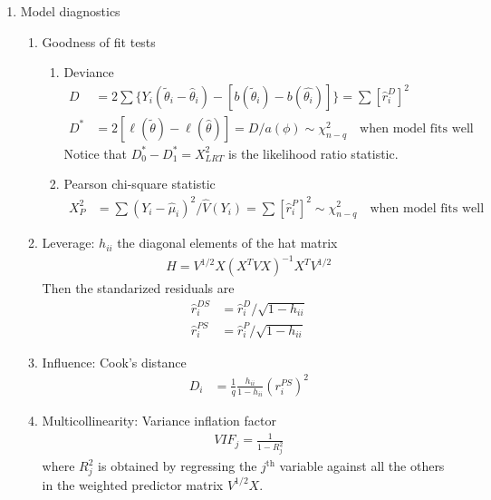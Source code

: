 \documentclass{amsart}
\begin{document}
\begin{enumerate}
\item Model diagnostics
  \begin{enumerate}
  \item Goodness of fit tests
    \begin{enumerate}
    \item Deviance
      \begin{align*}
        D & = 2 \sum \{ Y_i (\tilde{\theta}_i - \hat{\theta}_i) - [b(\tilde{\theta}_i) - b(\hat{\theta_i})] \} 
            = \sum[\hat{r}^D_i]^2 \\
        D^* & =  2 [ \ell(\tilde{\theta}) - \ell(\hat{\theta})]
              = D / a(\phi)
              \sim \chi^2_{n-q} \quad \text{when model fits well}
      \end{align*}
      Notice that $D^*_0 - D^*_1 = X^2_{LRT}$ is the likelihood ratio
      statistic.
    \item Pearson chi-square statistic
      \begin{align*}
        X^2_P & = \sum (Y_i - \hat{\mu}_i)^2 / \hat{V}(Y_i)
                = \sum[\hat{r}^P_i]^2
                \sim \chi^2_{n-q} \quad \text{when model fits well}
      \end{align*}
    \end{enumerate}

  \item Leverage: $h_{ii}$ the diagonal elements of the hat matrix
    \begin{align*}
      H = V^{1/2} X(X^T V X)^{-1} X^T V^{1/2}
    \end{align*}
    Then the standarized residuals are
    \begin{align*}
      \hat{r}^{DS}_i & = \hat{r}^D_i / \sqrt{1-h_{ii}} \\
      \hat{r}^{PS}_i & = \hat{r}^P_i / \sqrt{1-h_{ii}} 
    \end{align*}

  \item Influence: Cook's distance
    \begin{align*}
      D_i & = \frac{1}{q} \frac{h_{ii}}{1-h_{ii}}(r^{PS}_i)^2
    \end{align*}
    
  \item Multicollinearity: Variance inflation factor
    \begin{align*}
      VIF_j = \frac{1}{1-R^2_j}
    \end{align*}
    where $R^2_j$ is obtained by regressing the $j^\text{th}$ variable
    against all the others in the weighted predictor matrix
    $V^{1/2}X$.
  \end{enumerate}

    

  
\end{enumerate}
\end{document}
